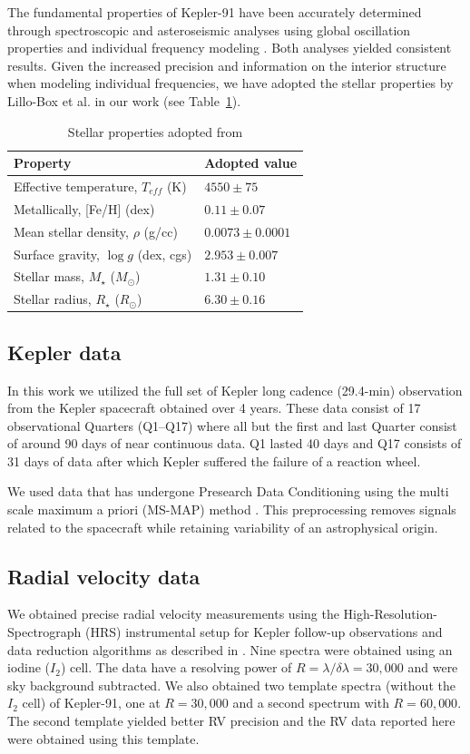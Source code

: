 \documentclass[apjl]{emulateapj}
\begin{document}
The fundamental properties of Kepler-91 have been accurately determined through spectroscopic and asteroseismic analyses using global oscillation properties \citep{huber13} and individual frequency modeling \citep{lillo14} . Both analyses yielded consistent results. Given the increased precision and information on the interior structure when modeling individual frequencies, we have adopted the stellar properties by Lillo-Box et al. in our work (see Table~\ref{tab:stellar}).

\begin{table}
\centering
\caption{Stellar properties adopted from \citet{lillo14}}\label{tab:stellar}
\begin{tabular}{l l }
Property & Adopted value \\
\hline
Effective temperature, $T_{eff}$ (K)		&	$4550\pm75$ \\
Metallically, [Fe/H] (dex)				& 	$0.11 \pm0.07$\\
Mean stellar density, $\rho$ (g/cc)		&	$0.0073 \pm0.0001$ \\
Surface gravity, $\log{g}$ (dex, cgs)		&	$2.953 \pm 0.007$ \\
Stellar mass, $M_\star$ ($M_\odot$)		&	$1.31 \pm 0.10$\\
Stellar radius, $R_\star$ ($R_\odot$)		&	$6.30 \pm 0.16$ \\
\hline
\end{tabular}
\end{table}


\subsection{Kepler data}
In this work we utilized the full set of Kepler long cadence (29.4-min) observation from the Kepler spacecraft obtained over 4 years. These data consist of 17 observational Quarters  (Q1--Q17) where all but the first and last Quarter consist of around 90 days of near continuous data. Q1 lasted 40 days and Q17 consists of 31 days of data after which Kepler suffered the failure of a reaction wheel.

We used data that has undergone Presearch Data Conditioning \citep{stumpe12,smith12} using the multi scale maximum a priori (MS-MAP) method \citep{stumpe14}. This preprocessing removes signals related to the spacecraft while retaining variability of an astrophysical origin.

\subsection{Radial velocity data}
We obtained precise radial velocity measurements using the High-Resolution-Spectrograph (HRS) \citep{tull98}
instrumental setup for Kepler follow-up observations and data reduction algorithms as described in \citet{endl11}. Nine spectra were obtained using an iodine ($I_2$) cell. The data have a resolving power of $R = \lambda/\delta\lambda = 30,000$ and were sky background subtracted. We also obtained two template spectra (without the $I_2$ cell) of Kepler-91, one at $R=30,000$ and a second spectrum with $R=60,000$. The second template yielded better RV precision and the RV data reported here were obtained using this template.
\end{document}
